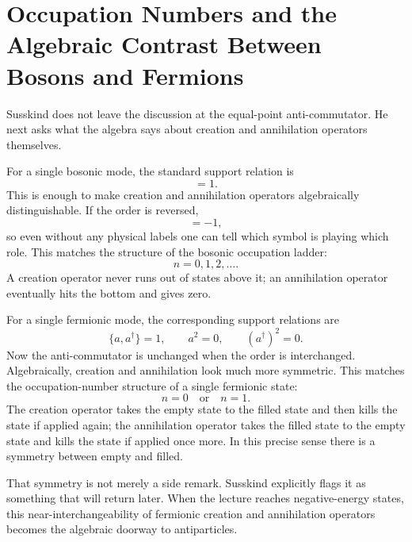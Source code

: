 \section{Occupation Numbers and the Algebraic Contrast Between Bosons and Fermions}

Susskind does not leave the discussion at the equal-point anti-commutator. He next asks what the algebra says about creation and annihilation operators themselves.

For a single bosonic mode, the standard support relation is
\begin{equation}
[a,a^\dagger]=1.
\end{equation}
This is enough to make creation and annihilation operators algebraically distinguishable. If the order is reversed,
\begin{equation}
[a^\dagger,a]=-1,
\end{equation}
so even without any physical labels one can tell which symbol is playing which role. This matches the structure of the bosonic occupation ladder:
\begin{equation}
n=0,1,2,\dots.
\end{equation}
A creation operator never runs out of states above it; an annihilation operator eventually hits the bottom and gives zero.

For a single fermionic mode, the corresponding support relations are
\begin{equation}
\{a,a^\dagger\}=1,
\qquad
a^2=0,
\qquad
(a^\dagger)^2=0.
\end{equation}
Now the anti-commutator is unchanged when the order is interchanged. Algebraically, creation and annihilation look much more symmetric. This matches the occupation-number structure of a single fermionic state:
\begin{equation}
n=0 \quad \text{or} \quad n=1.
\end{equation}
The creation operator takes the empty state to the filled state and then kills the state if applied again; the annihilation operator takes the filled state to the empty state and kills the state if applied once more. In this precise sense there is a symmetry between empty and filled.

That symmetry is not merely a side remark. Susskind explicitly flags it as something that will return later. When the lecture reaches negative-energy states, this near-interchangeability of fermionic creation and annihilation operators becomes the algebraic doorway to antiparticles.

